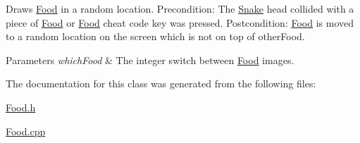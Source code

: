 \-Draws \hyperlink{classFood}{\-Food} in a random location. \-Precondition\-: \-The \hyperlink{classSnake}{\-Snake} head collided with a piece of \hyperlink{classFood}{\-Food} or \hyperlink{classFood}{\-Food} cheat code key was pressed. \-Postcondition\-: \hyperlink{classFood}{\-Food} is moved to a random location on the screen which is not on top of other\-Food. 


\begin{DoxyParams}{\-Parameters}
{\em which\-Food} & \-The integer switch between \hyperlink{classFood}{\-Food} images. \\
\hline
\end{DoxyParams}


\-The documentation for this class was generated from the following files\-:\begin{DoxyCompactItemize}
\item 
\hyperlink{Food_8h}{\-Food.\-h}\item 
\hyperlink{Food_8cpp}{\-Food.\-cpp}\end{DoxyCompactItemize}

